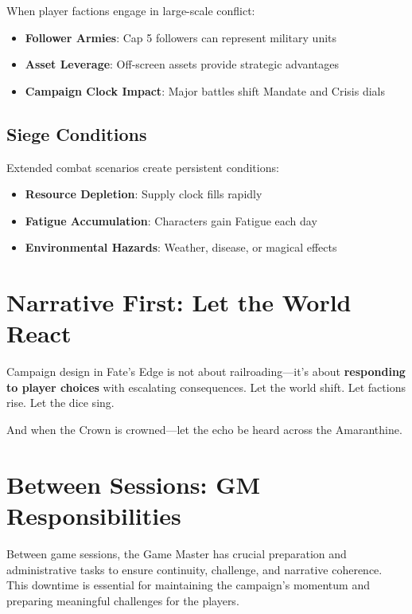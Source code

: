 When player factions engage in large-scale conflict:

\begin{itemize}
    \item \textbf{Follower Armies}: Cap 5 followers can represent military units
    \item \textbf{Asset Leverage}: Off-screen assets provide strategic advantages
    \item \textbf{Campaign Clock Impact}: Major battles shift Mandate and Crisis dials
\end{itemize}

\subsection*{Siege Conditions}

Extended combat scenarios create persistent conditions:

\begin{itemize}
    \item \textbf{Resource Depletion}: Supply clock fills rapidly
    \item \textbf{Fatigue Accumulation}: Characters gain Fatigue each day
    \item \textbf{Environmental Hazards}: Weather, disease, or magical effects
\end{itemize}

\section*{Narrative First: Let the World React}

Campaign design in Fate's Edge is not about railroading---it's about \textbf{responding to player choices} with escalating consequences. Let the world shift. Let factions rise. Let the dice sing.

And when the Crown is crowned---let the echo be heard across the Amaranthine.

\section{Between Sessions: GM Responsibilities}

Between game sessions, the Game Master has crucial preparation and administrative tasks to ensure continuity, challenge, and narrative coherence. This downtime is essential for maintaining the campaign's momentum and preparing meaningful challenges for the players.

